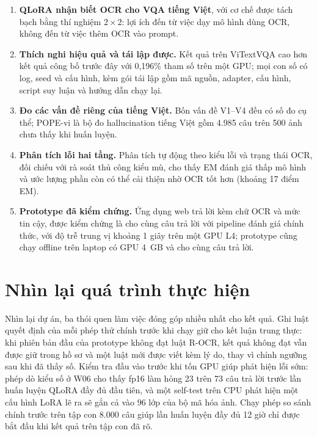 \begin{enumerate}
  \item \textbf{QLoRA nhận biết OCR cho VQA tiếng Việt}, với cơ chế được tách bạch
  bằng thí nghiệm $2\times2$: lợi ích đến từ việc dạy mô hình dùng OCR, không đến
  từ việc thêm OCR vào prompt.
  \item \textbf{Thích nghi hiệu quả và tái lập được.} Kết quả trên ViTextVQA cao
  hơn kết quả công bố trước đây với 0,196\% tham số trên một GPU; mọi con số có
  log, seed và cấu hình, kèm gói tái lập gồm mã nguồn, adapter, cấu hình, script
  suy luận và hướng dẫn chạy lại.
  \item \textbf{Đo các vấn đề riêng của tiếng Việt.} Bốn vấn đề V1--V4 đều có số
  đo cụ thể; POPE-vi là bộ đo hallucination tiếng Việt gồm 4.985 câu trên 500 ảnh
  chưa thấy khi huấn luyện.
  \item \textbf{Phân tích lỗi hai tầng.} Phân tích tự động theo kiểu lỗi và trạng
  thái OCR, đối chiếu với rà soát thủ công kiểu mù, cho thấy EM đánh giá thấp mô hình và ước
  lượng phần còn có thể cải thiện nhờ OCR tốt hơn (khoảng 17 điểm EM).
  \item \textbf{Prototype đã kiểm chứng.} Ứng dụng web trả lời kèm chữ OCR và mức
  tin cậy, được kiểm chứng là cho cùng câu trả lời với pipeline đánh giá chính thức, với độ
  trễ trung vị khoảng 1 giây trên một GPU L4; prototype cũng chạy offline trên laptop
  có GPU 4~GB và cho cùng câu trả lời.
\end{enumerate}

\section{Nhìn lại quá trình thực hiện}
\label{sec:con-reflect}

Nhìn lại dự án, ba thói quen làm việc đóng góp nhiều nhất cho kết quả. Ghi luật quyết định
của mỗi phép thử chính trước khi chạy giữ cho kết luận trung thực: khi phiên bản đầu của
prototype không đạt luật R-OCR, kết quả không đạt vẫn được giữ trong hồ sơ và một luật mới
được viết kèm lý do, thay vì chỉnh ngưỡng sau khi đã thấy số. Kiểm tra đầu vào trước khi tốn
GPU giúp phát hiện lỗi sớm: phép dò kiểu số ở W06 cho thấy fp16 làm hỏng 23 trên 73 câu trả
lời trước lần huấn luyện QLoRA đầy đủ đầu tiên, và một self-test trên CPU phát hiện một cấu
hình LoRA lẽ ra sẽ gắn cả vào 96 lớp của bộ mã hóa ảnh. Chạy phép so sánh chính trước trên
tập con 8.000 câu giúp lần huấn luyện đầy đủ 12 giờ chỉ được bắt đầu khi kết quả trên tập con
đã rõ.

